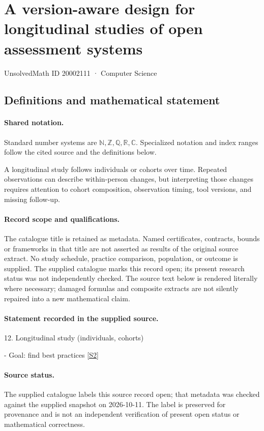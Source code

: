 \documentclass[11pt]{article}
\newcommand{\sref}[2]{\hyperlink{source:#1:#2}{[S#2]}}
\begin{document}
\setcounter{section}{20002110}
\section{A version-aware design for longitudinal studies of open assessment systems}\label{20002111}
{\small\sffamily UnsolvedMath ID 20002111 · Computer Science}
\subsection{Definitions and mathematical statement}

\paragraph{Shared notation.}Standard number systems are $\mathbb N,\mathbb Z,\mathbb Q,\mathbb R,\mathbb C$. Specialized notation and index ranges follow the cited source and the definitions below.


A longitudinal study follows individuals or cohorts over time. Repeated observations can describe within-person changes, but interpreting those changes requires attention to cohort composition, observation timing, tool versions, and missing follow-up.
\paragraph{Record scope and qualifications.}
The catalogue title is retained as metadata. Named certificates, contracts, bounds or frameworks in that title are not asserted as results of the original source extract.
No study schedule, practice comparison, population, or outcome is supplied. The supplied catalogue marks this record open; its present research status was not independently checked.
The source text below is rendered literally where necessary; damaged formulas and composite extracts are not silently repaired into a new mathematical claim.
\paragraph{Statement recorded in the supplied source.}
12. Longitudinal study (individuals, cohorts)

- Goal: find best practices \sref{20002111}{2}
\paragraph{Source status.}
The supplied catalogue labels this source record open; that metadata was checked against the supplied snapshot on 2026-10-11. The label is preserved for provenance and is not an independent verification of present open status or mathematical correctness.
\end{document}
